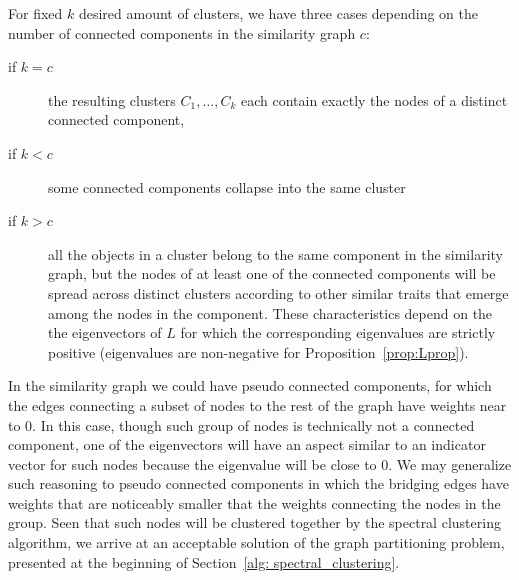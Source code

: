 For fixed $k$ desired amount of clusters, we have three cases depending on the number of connected components in the similarity graph $c$:
\begin{description}
    \item[if \boldmath$k=c$] the resulting clusters $C_1,\dots,C_k$ each contain exactly the nodes of a distinct connected component,
    \item[if \boldmath$k<c$] some connected components collapse into the same cluster
    \item[if \boldmath$k>c$] all the objects in a cluster belong to the same component in the similarity graph, but the nodes of at least one of the connected components will be spread across distinct clusters according to other similar traits that emerge among the nodes in the component. These characteristics depend on the the eigenvectors of $L$ for which the corresponding eigenvalues are strictly positive (eigenvalues are non-negative for Proposition~\ref{prop:Lprop}).
\end{description}
In the similarity graph we could have pseudo connected components, for which the edges connecting a subset of nodes to the rest of the graph have weights near to 0. In this case, though such group of nodes is technically not a connected component, one of the eigenvectors will have an aspect similar to an indicator vector for such nodes because the eigenvalue will be close to 0. We may generalize such reasoning to pseudo connected components in which the bridging edges have weights that are noticeably smaller that the weights connecting the nodes in the group. Seen that such nodes will be clustered together by the spectral clustering algorithm, we arrive at an acceptable solution of the graph partitioning problem, presented at the beginning of Section~\ref{alg: spectral_clustering}.